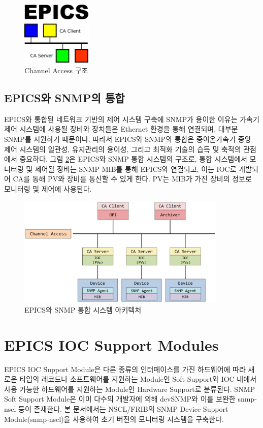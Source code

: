 \documentclass[11pt
  , a4paper
  , article
  , oneside
]{memoir}
\begin{document}
\begin{figure}[h!]
  \centering
  \includegraphics[width=0.3\textwidth]{./images/epics.eps}
  \caption{Channel Access 구조}
  \label{fig:ca}     
\end{figure}

\section{EPICS와 SNMP의 통합}
EPICS와 통합된 네트워크 기반의 제어 시스템 구축에 SNMP가 용이한 이유는 가속기 제어 시스템에 사용될 장비와 장치들은 Ethernet 환경을 통해 연결되며, 대부분 SNMP를 지원하기 때문이다. 따라서 EPICS와 SNMP의 통합은 중이온가속기 중앙 제어 시스템의 일관성, 유지관리의 용이성, 그리고 최적화 기술의 습득 및 축적의 관점에서 중요하다. 그림 \ref{fig:architecture}은 EPICS와 SNMP 통합 시스템의 구조로, 통합 시스템에서 모니터링 및 제어될 장비는 SNMP MIB를 통해 EPICS와 연결되고, 이는 IOC로 개발되어 CA를 통해 PV와 장비를 통신할 수 있게 한다. PV는 MIB가 가진 장비의 정보로 모니터링 및 제어에 사용된다\citep{epicssnmp}. 

\begin{figure}[h!]
  \centering
  \includegraphics[width=0.89\textwidth]{./images/architecture.eps}
  \caption{EPICS와 SNMP 통합 시스템 아키텍처}
  \label{fig:architecture}   
\end{figure}

\chapter{EPICS IOC Support Modules}
EPICS IOC Support Module은 다른 종류의 인터페이스를 가진 하드웨어에 따라 새로운 타입의 레코드나 소프트웨어를 지원하는 Module인 Soft Support와 IOC 내에서 사용 가능한 하드웨어를 지원하는 Module인 Hardware Support로 분류된다. SNMP Soft Support Module은 이미 다수의 개발자에 의해 devSNMP와 이를 보완한 snmp-nscl 등이 존재한다. 본 문서에서는 NSCL/FRIB의 SNMP Device Support Module(snmp-nscl)을 사용하여 초기 버전의 모니터링 시스템을 구축한다\citep{modules}.
\end{document}
